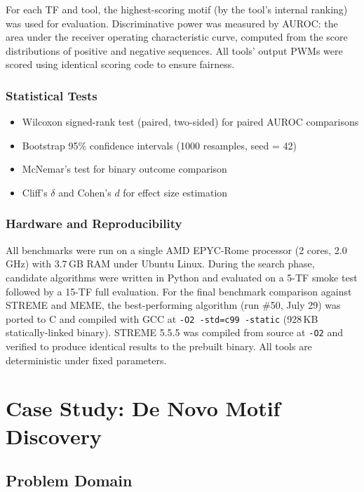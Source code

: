 \documentclass[11pt,a4paper]{article}
\begin{document}
For each TF and tool, the highest-scoring motif (by the tool's internal ranking) was used for evaluation. Discriminative power was measured by AUROC: the area under the receiver operating characteristic curve, computed from the score distributions of positive and negative sequences. All tools' output PWMs were scored using identical scoring code to ensure fairness.

\subsubsection{Statistical Tests}

\begin{itemize}
    \item Wilcoxon signed-rank test (paired, two-sided) for paired AUROC comparisons
    \item Bootstrap 95\% confidence intervals (1000 resamples, seed = 42)
    \item McNemar's test for binary outcome comparison
    \item Cliff's $\delta$ and Cohen's $d$ for effect size estimation
\end{itemize}

\subsubsection{Hardware and Reproducibility}

All benchmarks were run on a single AMD EPYC-Rome processor (2 cores, 2.0\,GHz) with 3.7\,GB RAM under Ubuntu Linux. During the search phase, candidate algorithms were written in Python and evaluated on a 5-TF smoke test followed by a 15-TF full evaluation. For the final benchmark comparison against STREME and MEME, the best-performing algorithm (run \#50, July 29) was ported to C and compiled with GCC at \texttt{-O2 -std=c99 -static} (928\,KB statically-linked binary). STREME 5.5.5 was compiled from source at \texttt{-O2} and verified to produce identical results to the prebuilt binary. All tools are deterministic under fixed parameters.

\section{Case Study: De Novo Motif Discovery}
\label{sec:casestudy}

\subsection{Problem Domain}
\end{document}

